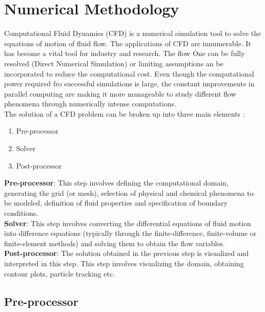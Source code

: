 
\chapter{Numerical Methodology} %

\label{Chapter3} %
Computational Fluid Dynamics (CFD) is a numerical simulation tool to solve the equations of motion of fluid flow. The applications of CFD are innumerable. It has become a vital tool for industry and research. The flow One can be fully resolved (Direct Numerical Simulation) or limiting assumptions an be incorporated to reduce the computational cost. Even though the computational power required fro successful simulations is large, the constant improvements in parallel computing are making it more manageable to study different flow phenomena through numerically intense computations.\\
The solution of a CFD problem can be broken up into three main elements \cite{Reference8}:
\begin{enumerate}
\item Pre-processor
\item Solver
\item Post-processor
\end{enumerate}
\textbf{Pre-processor}: This step involves defining the computational domain, generating the grid (or mesh), selection of physical and chemical phenomena to be modeled, definition of fluid properties and specification of boundary conditions.\\
\textbf{Solver}: This step involves converting the differential equations of fluid motion into difference equations (typically through the finite-difference, finite-volume or finite-element methods) and solving them to obtain the flow variables. \\%
\textbf{Post-processor}: The solution obtained in the previous step is visualized and interpreted in this step. This step involves visualizing the domain, obtaining contour plots, particle tracking etc.
\section{Pre-processor}
